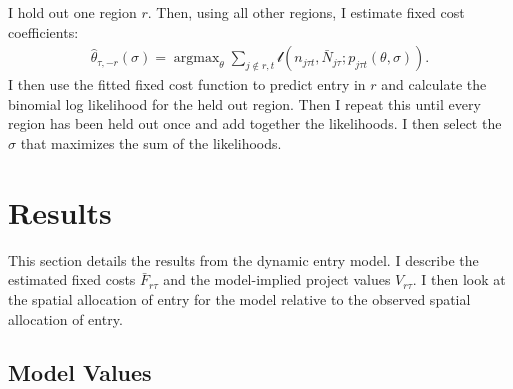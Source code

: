 \documentclass[12pt]{article}
\DeclareMathOperator*{\argmax}{argmax}
\begin{document}
I hold out one region $r$. Then, using all other regions, I estimate fixed cost coefficients:
\begin{align}
    \hat{\theta}_{\tau,-r}(\sigma) = \argmax_\theta \sum_{j \notin r,t} \mathcal{l}(n_{j\tau t}, \bar{N}_{j\tau}; p_{j\tau t}(\theta, \sigma)).
\end{align}
I then use the fitted fixed cost function to predict entry in $r$ and calculate the binomial log likelihood for the held out region. Then I repeat this until every region has been held out once and add together the likelihoods. I then select the $\sigma$ that maximizes the sum of the likelihoods.



\section{Results}
\label{sec:results}
This section details the results from the dynamic entry model. I describe the estimated fixed costs $\bar{F}_{r\tau}$ and the model-implied project values $V_{r\tau}$. I then look at the spatial allocation of entry for the model relative to the observed spatial allocation of entry. 

\subsection{Model Values}
\end{document}
